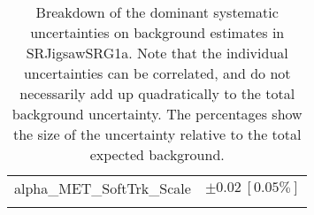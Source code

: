 \begin{table}
\begin{center}
\begin{tabular*}{\textwidth}{@{\extracolsep{\fill}}lc}
alpha\_MET\_SoftTrk\_Scale         & $\pm 0.02\ [0.05\%] $       \\
\noalign{\smallskip}\hline\noalign{\smallskip}
\end{tabular*}
\end{center}
\caption[Breakdown of uncertainty on background estimates]{
Breakdown of the dominant systematic uncertainties on background estimates in SRJigsawSRG1a.
Note that the individual uncertainties can be correlated, and do not necessarily add up quadratically to 
the total background uncertainty. The percentages show the size of the uncertainty relative to the total expected background.
\label{table.results.bkgestimate.uncertainties.SRJigsawSRG1a}}
\end{table}
%